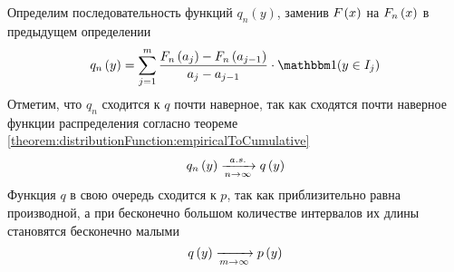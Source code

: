 Определим последовательность функций $q_n\left(y\right)$,
заменив $F_{}\left(x\right)$ на $F_n\left(x\right)$ в предыдущем определении
\begin{equation}\label{eq:histogram_start}
q_n\left(y\right)
=\sum_{j=1}^m \frac{\cdfn{a_j}-\cdfn{a_{j-1}}}{a_j-a_{j-1}}
  \cdot\indicator{y\in I_j}
\end{equation}
Отметим, что $q_n$ сходится к $q$ почти наверное, так как сходятся почти
наверное функции распределения согласно теореме
\ref{theorem:distributionFunction:empiricalToCumulative}
$$q_n\left(y\right)\xrightarrow[n\to\infty]{a.s.} q\left(y\right)$$
Функция $q$ в свою очередь сходится к $p$, так как приблизительно равна
производной, а при бесконечно большом количестве интервалов их длины
становятся бесконечно малыми
$$q\left(y\right)\xrightarrow[m\to\infty]{}p\left(y\right)$$
\begin{comment}
Функция $q_n$ называется гистограммой.
\index{гистограмма}
Избавимся от $a_j$ в формуле, а для этого вспомним, чему равно $\cdfn{x}$
$$\cdfn{x}=\frac{1}{n}\cdot \sum_{k=1}^n
\indicator{x_k\le x}$$

Теперь посмотрим, чему равна разность $\cdfn{a_j}-\cdfn{a_{j-1}}$,
которая, как мы видим, является вероятностью того,
что $x$ попало в отрезок $I_j$
\begin{align*}
  \cdfn{a_j}-\cdfn{a_{j-1}}=\\
  =\frac{1}{n}\cdot \sum_{k=1}^n
    \indicator{x_k\le a_j}-\frac{1}{n}\cdot \sum_{k=1}^n
    \indicator{x_k\le a_{j-1}}
\end{align*}

Сгруппируем слагаемые и получим чуть более компактную запись разности
\begin{eqnarray}\label{eq:cdfn_difference}
  \cdfn{a_j}-\cdfn{a_{j-1}}=\nonumber\\
  =\frac{1}{n}\cdot \sum_{k=1}^n
    \left[\indicator{x_k\le a_j}-\indicator{x_k\le a_{j-1}}\right]
\end{eqnarray}

Рассмотрим возможные значения индикаторов

Если оба индикатора равны единице,
это значит, что $x_k$ не больше $a_j$ и не больше $a_{j-1}$.
Поскольку $a_{j-1}\le a_j$, то можно обойтись тем, что $x\le a_{j-1}$
\begin{align*}
  \begin{cases}
    \indicator{x_k\le a_j}=1\\
    \indicator{x_k\le a_{j-1}}=1\\
    a_{j-1} < a_j
  \end{cases}
  \Rightarrow
  \begin{cases}
    x_k\le a_j\\
    x_k\le a_{j-1}\\
    a_{j-1} < a_j
  \end{cases}
  \\\Rightarrow
    x_k\le a_{j-1} < a_j
  \Rightarrow
    x_k\le a_{j-1}
\end{align*}


\end{comment}
